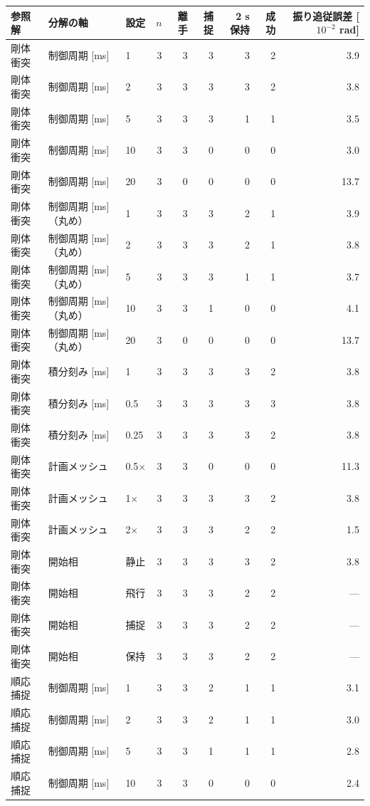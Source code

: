 \begin{tabular}{lllrrrrrr}
\toprule
参照解 & 分解の軸 & 設定 & $n$ & 離手 & 捕捉 & 2 s 保持 & 成功 & 振り追従誤差 [$10^{-2}$ rad] \\
\midrule
剛体衝突 & 制御周期 [ms] & 1 & 3 & 3 & 3 & 3 & 2 & 3.9 \\
剛体衝突 & 制御周期 [ms] & 2 & 3 & 3 & 3 & 3 & 2 & 3.8 \\
剛体衝突 & 制御周期 [ms] & 5 & 3 & 3 & 3 & 1 & 1 & 3.5 \\
剛体衝突 & 制御周期 [ms] & 10 & 3 & 3 & 0 & 0 & 0 & 3.0 \\
剛体衝突 & 制御周期 [ms] & 20 & 3 & 0 & 0 & 0 & 0 & 13.7 \\
剛体衝突 & 制御周期 [ms]（丸め） & 1 & 3 & 3 & 3 & 2 & 1 & 3.9 \\
剛体衝突 & 制御周期 [ms]（丸め） & 2 & 3 & 3 & 3 & 2 & 1 & 3.8 \\
剛体衝突 & 制御周期 [ms]（丸め） & 5 & 3 & 3 & 3 & 1 & 1 & 3.7 \\
剛体衝突 & 制御周期 [ms]（丸め） & 10 & 3 & 3 & 1 & 0 & 0 & 4.1 \\
剛体衝突 & 制御周期 [ms]（丸め） & 20 & 3 & 0 & 0 & 0 & 0 & 13.7 \\
剛体衝突 & 積分刻み [ms] & 1 & 3 & 3 & 3 & 3 & 2 & 3.8 \\
剛体衝突 & 積分刻み [ms] & 0.5 & 3 & 3 & 3 & 3 & 3 & 3.8 \\
剛体衝突 & 積分刻み [ms] & 0.25 & 3 & 3 & 3 & 3 & 2 & 3.8 \\
剛体衝突 & 計画メッシュ & 0.5× & 3 & 3 & 0 & 0 & 0 & 11.3 \\
剛体衝突 & 計画メッシュ & 1× & 3 & 3 & 3 & 3 & 2 & 3.8 \\
剛体衝突 & 計画メッシュ & 2× & 3 & 3 & 3 & 2 & 2 & 1.5 \\
剛体衝突 & 開始相 & 静止 & 3 & 3 & 3 & 3 & 2 & 3.8 \\
剛体衝突 & 開始相 & 飛行 & 3 & 3 & 3 & 2 & 2 & --- \\
剛体衝突 & 開始相 & 捕捉 & 3 & 3 & 3 & 2 & 2 & --- \\
剛体衝突 & 開始相 & 保持 & 3 & 3 & 3 & 2 & 2 & --- \\
\midrule
順応捕捉 & 制御周期 [ms] & 1 & 3 & 3 & 2 & 1 & 1 & 3.1 \\
順応捕捉 & 制御周期 [ms] & 2 & 3 & 3 & 2 & 1 & 1 & 3.0 \\
順応捕捉 & 制御周期 [ms] & 5 & 3 & 3 & 1 & 1 & 1 & 2.8 \\
順応捕捉 & 制御周期 [ms] & 10 & 3 & 3 & 0 & 0 & 0 & 2.4 \\

\end{tabular}
